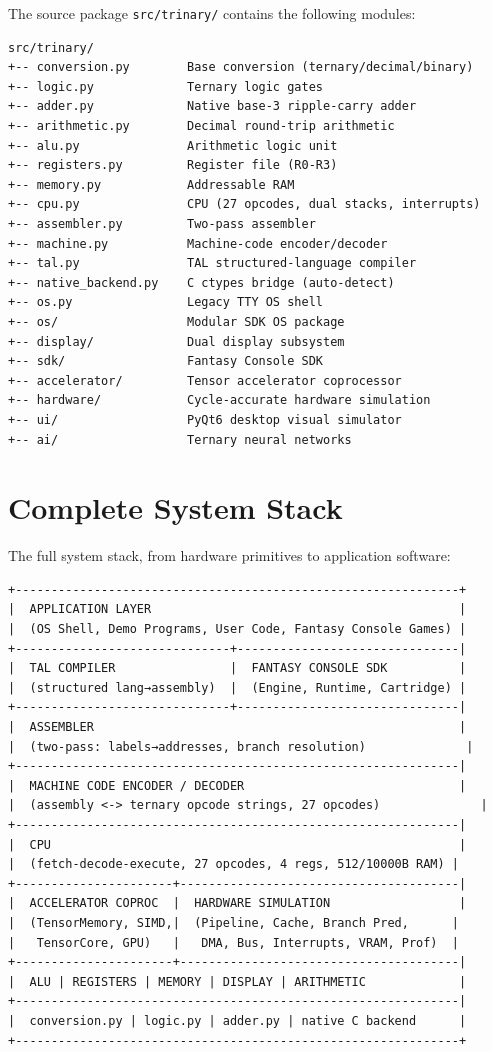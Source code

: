\documentclass[10pt,a4paper,twoside]{book}
\begin{document}
The source package \texttt{src/trinary/} contains the following modules:

\begin{verbatim}
src/trinary/
+-- conversion.py        Base conversion (ternary/decimal/binary)
+-- logic.py             Ternary logic gates
+-- adder.py             Native base-3 ripple-carry adder
+-- arithmetic.py        Decimal round-trip arithmetic
+-- alu.py               Arithmetic logic unit
+-- registers.py         Register file (R0-R3)
+-- memory.py            Addressable RAM
+-- cpu.py               CPU (27 opcodes, dual stacks, interrupts)
+-- assembler.py         Two-pass assembler
+-- machine.py           Machine-code encoder/decoder
+-- tal.py               TAL structured-language compiler
+-- native_backend.py    C ctypes bridge (auto-detect)
+-- os.py                Legacy TTY OS shell
+-- os/                  Modular SDK OS package
+-- display/             Dual display subsystem
+-- sdk/                 Fantasy Console SDK
+-- accelerator/         Tensor accelerator coprocessor
+-- hardware/            Cycle-accurate hardware simulation
+-- ui/                  PyQt6 desktop visual simulator
+-- ai/                  Ternary neural networks
\end{verbatim}

\section{Complete System Stack}

The full system stack, from hardware primitives to application software:

\begin{verbatim}
+--------------------------------------------------------------+
|  APPLICATION LAYER                                           |
|  (OS Shell, Demo Programs, User Code, Fantasy Console Games) |
+------------------------------+-------------------------------|
|  TAL COMPILER                |  FANTASY CONSOLE SDK          |
|  (structured lang→assembly)  |  (Engine, Runtime, Cartridge) |
+------------------------------+-------------------------------|
|  ASSEMBLER                                                   |
|  (two-pass: labels→addresses, branch resolution)              |
+--------------------------------------------------------------|
|  MACHINE CODE ENCODER / DECODER                              |
|  (assembly <-> ternary opcode strings, 27 opcodes)              |
+--------------------------------------------------------------|
|  CPU                                                         |
|  (fetch-decode-execute, 27 opcodes, 4 regs, 512/10000B RAM) |
+----------------------+---------------------------------------|
|  ACCELERATOR COPROC  |  HARDWARE SIMULATION                  |
|  (TensorMemory, SIMD,|  (Pipeline, Cache, Branch Pred,      |
|   TensorCore, GPU)   |   DMA, Bus, Interrupts, VRAM, Prof)  |
+----------------------+---------------------------------------|
|  ALU | REGISTERS | MEMORY | DISPLAY | ARITHMETIC             |
+--------------------------------------------------------------|
|  conversion.py | logic.py | adder.py | native C backend      |
+--------------------------------------------------------------+
\end{verbatim}
\end{document}
